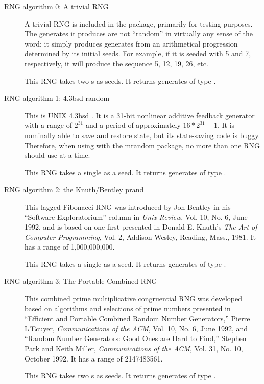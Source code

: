 \begin{description}

\item[RNG algorithm 0: A trivial RNG] A trivial RNG is included in the
package, primarily for testing purposes.  The generates it produces are
not ``random'' in virtually any sense of the word; it simply produces
generates from an arithmetical progression determined by its initial
seeds.  For example, if it is seeded with 5 and 7, respectively, it will
produce the sequence 5, 12, 19, 26, etc.

This RNG takes two s as seeds.  It returns generates
of type .

\item[RNG algorithm 1: 4.3bsd random]
\begin{tex}
This is UNIX 4.3bsd .  It is a 31-bit nonlinear additive
feedback generator with a range of $2^{31}$ and a period of
approximately $16*2^{31}-1$.  It is nominally able to save and restore
state, but its state-saving code is buggy.  Therefore, when using
 with the mrandom package, no more than one RNG should use
 at a time.
\end{tex}

This RNG takes a single  as a seed.  It returns generates of
type .

\item[RNG algorithm 2: the Knuth/Bentley prand]  This
lagged-Fibonacci RNG was introduced by Jon Bentley in his ``Software
Exploratorium'' column in {\em Unix Review}, Vol. 10, No. 6, June 1992,
and is based on one first presented in Donald E. Knuth's {\em The Art of
Computer Programming}, Vol. 2, Addison-Wesley, Reading, Mass., 1981.
It has a range of 1,000,000,000.

This RNG takes a single  as a seed.  It returns generates of
type .

\item[RNG algorithm 3: The Portable Combined RNG]  This combined
prime multiplicative congruential RNG was developed based on algorithms
and selections of prime numbers presented in ``Efficient and Portable
Combined Random Number Generators,'' Pierre L'Ecuyer, {\em
Communications of the ACM}, Vol. 10, No. 6, June 1992, and ``Random
Number Generators: Good Ones are Hard to Find,'' Stephen Park and Keith
Miller, {\em Communications of the ACM}, Vol. 31, No. 10, October 1992.
It has a range of 2147483561.

This RNG takes two s as seeds.  It returns generates of type
.


\end{description}
